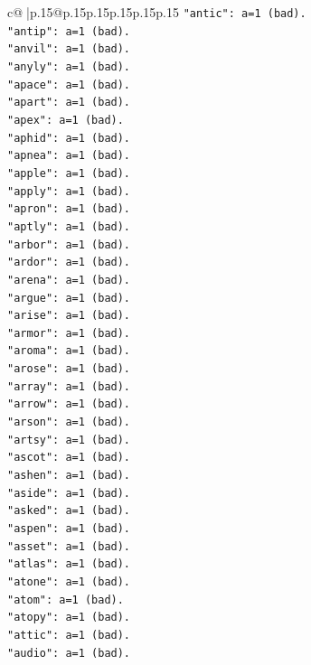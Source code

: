 \documentclass{article}
\begin{document}
{\begin{supertabular}{c@{$\;$}|p{.15\linewidth}@{}p{.15\linewidth}p{.15\linewidth}p{.15\linewidth}p{.15\linewidth}p{.15\linewidth}}
{{{\texttt{"antic": a=1 (bad).} \\
\texttt{"antip": a=1 (bad).} \\
\texttt{"anvil": a=1 (bad).} \\
\texttt{"anyly": a=1 (bad).} \\
\texttt{"apace": a=1 (bad).} \\
\texttt{"apart": a=1 (bad).} \\
\texttt{"apex": a=1 (bad).} \\
\texttt{"aphid": a=1 (bad).} \\
\texttt{"apnea": a=1 (bad).} \\
\texttt{"apple": a=1 (bad).} \\
\texttt{"apply": a=1 (bad).} \\
\texttt{"apron": a=1 (bad).} \\
\texttt{"aptly": a=1 (bad).} \\
\texttt{"arbor": a=1 (bad).} \\
\texttt{"ardor": a=1 (bad).} \\
\texttt{"arena": a=1 (bad).} \\
\texttt{"argue": a=1 (bad).} \\
\texttt{"arise": a=1 (bad).} \\
\texttt{"armor": a=1 (bad).} \\
\texttt{"aroma": a=1 (bad).} \\
\texttt{"arose": a=1 (bad).} \\
\texttt{"array": a=1 (bad).} \\
\texttt{"arrow": a=1 (bad).} \\
\texttt{"arson": a=1 (bad).} \\
\texttt{"artsy": a=1 (bad).} \\
\texttt{"ascot": a=1 (bad).} \\
\texttt{"ashen": a=1 (bad).} \\
\texttt{"aside": a=1 (bad).} \\
\texttt{"asked": a=1 (bad).} \\
\texttt{"aspen": a=1 (bad).} \\
\texttt{"asset": a=1 (bad).} \\
\texttt{"atlas": a=1 (bad).} \\
\texttt{"atone": a=1 (bad).} \\
\texttt{"atom": a=1 (bad).} \\
\texttt{"atopy": a=1 (bad).} \\
\texttt{"attic": a=1 (bad).} \\
\texttt{"audio": a=1 (bad).} \\
}}}
\end{supertabular}}
\end{document}
